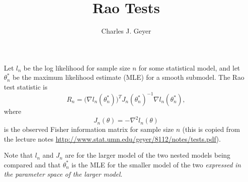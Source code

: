 \documentclass{article}
\begin{document}
\title{Rao Tests}

\author{Charles J. Geyer}

\maketitle

Let $l_n$ be the log likelihood for sample size $n$ for some statistical
model, and let $\theta^*_n$ be the maximum likelihood estimate (MLE)
for a smooth submodel.
The Rao test statistic is
\begin{equation} \label{eq:rao}
   R_n = 
   \bigl(\nabla l_n(\theta^*_n)\bigr)^T J_n(\theta^*_n)^{-1}
   \nabla l_n(\theta^*_n),
\end{equation}
where 
$$
   J_n(\theta) = - \nabla^2 l_n(\theta)
$$
is the observed Fisher information matrix for sample size $n$
(this is copied from the lecture notes
\url{http://www.stat.umn.edu/geyer/8112/notes/tests.pdf}).

Note that $l_n$ and $J_n$ are for the larger model of the two nested
models being compared and that $\theta^*_n$ is the MLE for the smaller
model of the two \emph{expressed in the parameter space of the larger
model}.
\end{document}
